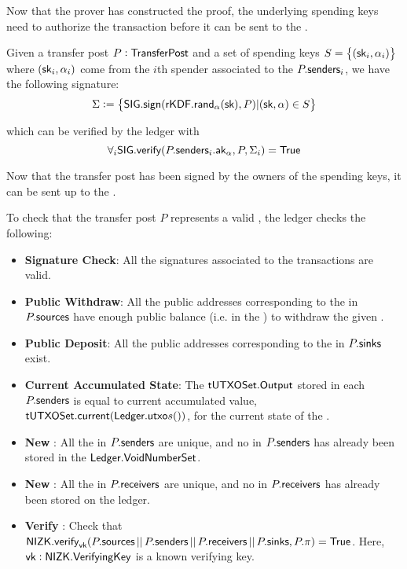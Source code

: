 Now that the prover has constructed the proof, the underlying spending keys need to authorize the transaction before it can be sent to the \Ledger{}.

\begin{definition}
    Given a transfer post $P: {\textsf{TransferPost}}{}$ and a set of spending keys $S = \set{({\textsf{sk}}_i, \alpha_i)}$ where $({\textsf{sk}}_i, \alpha_i)$ come from the $i$th spender associated to the $P.{\textsf{senders}}_i$, we have the following signature:
    \[\Sigma := \set{{\textsf{SIG}}.{\textsf{sign}}({\textsf{rKDF}}.{\textsf{rand}}_\alpha({\textsf{sk}}), P) | ({\textsf{sk}}, \alpha) \in S}\]

    which can be verified by the ledger with 
    \[\forall_i{\textsf{SIG}}.{\textsf{verify}}(P.{\textsf{senders}}_i.{\textsf{ak}}_\alpha, P, \Sigma_i) = {\textsf{True}}\]
\end{definition}

Now that the transfer post has been signed by the owners of the spending keys, it can be sent up to the \Ledger{}.

\begin{definition}
    To check that the transfer post $P$ represents a valid \Transfer{}, the ledger checks the following:
    \begin{itemize}
        \item \textbf{Signature Check}: All the signatures associated to the transactions are valid.
        \item \textbf{Public Withdraw}: All the public addresses corresponding to the  in $P.{\textsf{sources}}$ have enough public balance (i.e. in the \PublicLedger{}) to withdraw the given \Asset{}.
        \item \textbf{Public Deposit}: All the public addresses corresponding to the  in $P.{\textsf{sinks}}$ exist.
        \item \textbf{Current Accumulated State}: The ${\textsf{tUTXOSet}}.{\textsf{Output}}$ stored in each $P.{\textsf{senders}}$ is equal to current accumulated value, ${\textsf{tUTXOSet}}.{\textsf{current}}({\textsf{Ledger}}.{\textsf{utxo}}{s}())$, for the current state of the \Ledger{}.
        \item \textbf{New }: All the  in $P.{\textsf{senders}}$ are unique, and no \VoidNumber{} in $P.{\textsf{senders}}$ has already been stored in the ${\textsf{Ledger}}.{\textsf{VoidNumberSet}}$.
        \item \textbf{New }: All the  in $P.{\textsf{receivers}}$ are unique, and no \UTXO{} in $P.{\textsf{receivers}}$ has already been stored on the ledger.
        \item \textbf{Verify \Transfer{}}: Check that ${\textsf{NIZK}}.{\textsf{verify}}_{\textsf{vk}}(P.{\textsf{sources}} \,||\, P.{\textsf{senders}} \,||\, P.{\textsf{receivers}} \,||\, P.{\textsf{sinks}}, P.\pi) = {\textsf{True}}$. Here, ${\textsf{vk}} : {\textsf{NIZK}}.{\textsf{VerifyingKey}}$ is a known verifying key.
    \end{itemize}
\end{definition}

